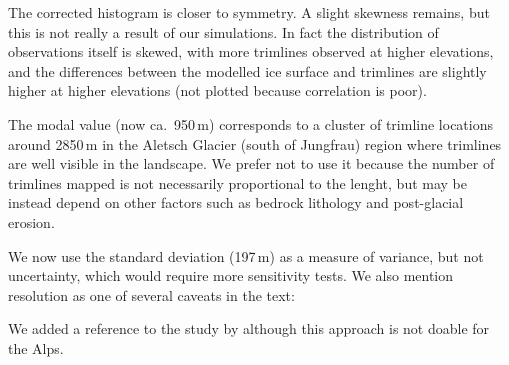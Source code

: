     The corrected histogram is closer to symmetry. A slight skewness remains,
    but this is not really a result of our simulations. In fact the
    distribution of observations itself is skewed, with more trimlines observed
    at higher elevations, and the differences between the modelled ice surface
    and trimlines are slightly higher at higher elevations (not plotted because
    correlation is poor).

    The modal value (now ca.~950\,m) corresponds to a cluster of trimline
    locations around 2850\,m in the Aletsch Glacier (south of Jungfrau) region
    where trimlines are well visible in the landscape. We prefer not to
    use it because the number of trimlines mapped is not necessarily
    proportional to the lenght, but may be instead depend on other factors such
    as bedrock lithology and post-glacial erosion.

    We now use the standard deviation (197\,m) as a measure of variance, but
    not uncertainty, which would require more sensitivity tests. We also
    mention resolution as one of several caveats in the text:


    We added a reference to the study by \citet{Kuchar.etal.2012} although this
    approach is not doable for the Alps.




